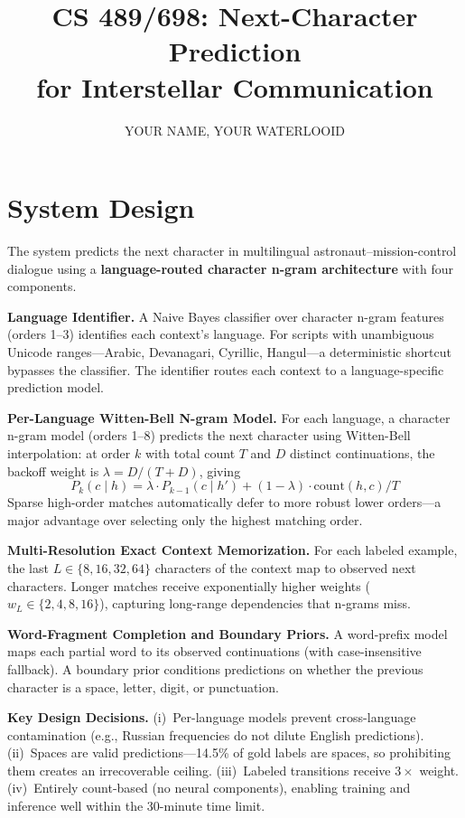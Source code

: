 \documentclass[11pt]{article}
\title{\vspace{-1.5em}CS 489/698: Next-Character Prediction \\ for Interstellar Communication\vspace{-0.5em}}
\author{YOUR NAME, YOUR WATERLOOID}
\date{}
\begin{document}
\maketitle
\vspace{-2em}

\section{System Design}

The system predicts the next character in multilingual astronaut--mission-control dialogue using a \textbf{language-routed character n-gram architecture} with four components.

\textbf{Language Identifier.}
A Naive Bayes classifier over character n-gram features (orders 1--3) identifies each context's language. For scripts with unambiguous Unicode ranges---Arabic, Devanagari, Cyrillic, Hangul---a deterministic shortcut bypasses the classifier. The identifier routes each context to a language-specific prediction model.

\textbf{Per-Language Witten-Bell N-gram Model.}
For each language, a character n-gram model (orders 1--8) predicts the next character using Witten-Bell interpolation: at order $k$ with total count $T$ and $D$ distinct continuations, the backoff weight is $\lambda = D/(T+D)$, giving 
\[ P_k(c \mid h) = \lambda \cdot P_{k-1}(c \mid h') + (1-\lambda) \cdot \text{count}(h,c)/T\]
Sparse high-order matches automatically defer to more robust lower orders---a major advantage over selecting only the highest matching order.

\textbf{Multi-Resolution Exact Context Memorization.}
For each labeled example, the last $L \in \{8, 16, 32, 64\}$ characters of the context map to observed next characters. Longer matches receive exponentially higher weights ($w_L \in \{2, 4, 8, 16\}$), capturing long-range dependencies that n-grams miss.

\textbf{Word-Fragment Completion and Boundary Priors.}
A word-prefix model maps each partial word to its observed continuations (with case-insensitive fallback). A boundary prior conditions predictions on whether the previous character is a space, letter, digit, or punctuation.

\textbf{Key Design Decisions.}
(i)~Per-language models prevent cross-language contamination (e.g., Russian frequencies do not dilute English predictions).
(ii)~Spaces are valid predictions---14.5\% of gold labels are spaces, so prohibiting them creates an irrecoverable ceiling.
(iii)~Labeled transitions receive $3\times$ weight.
(iv)~Entirely count-based (no neural components), enabling training and inference well within the 30-minute time limit.
\end{document}
